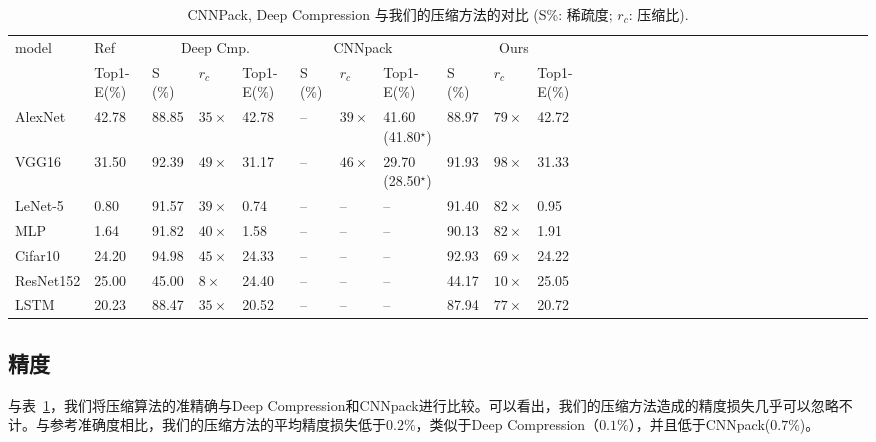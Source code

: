 \begin{table}[h]
\centering
\caption{\footnotesize CNNPack, Deep Compression 与我们的压缩方法的对比 (S\%: 稀疏度; $r_c$: 压缩比).}
\scriptsize
\label{tab:deepratio}
\centering
\begin{tabular}{l@{~~}@{~~}lll@{~~}lll@{~~}lllll@{~~}lll@{~~}lll@{~~}lllll@{~~}lll@{~~}lll@{~~}ll}
\toprule
model 	& Ref 				& \multicolumn{3}{c}{Deep Cmp.~\cite{han2015deep}} 	& \multicolumn{3}{c}{CNNpack~\cite{wang2016cnnpack}} 	& \multicolumn{3}{c}{Ours}				\\
  		& Top1-E(\%) 		& S (\%) & $r_c$ & Top1-E(\%) 	 					& S (\%) & $r_c$ & Top1-E(\%)  	 						&S (\%) & $r_c$ & Top1-E(\%) 		\\
\midrule
AlexNet  	& 42.78			& 88.85	& $35\times$ 	& 42.78 							& --	 &  $39\times$  & 41.60 (41.80$^{\star}$) 				 		& 88.97 & $79\times$	& 42.72				\\
VGG16		& 31.50			& 92.39	& $49\times$ 	& 31.17								& --	 &  $46\times$  & 29.70 (28.50$^{\star}$)							& 91.93  & $98\times$ 	& 31.33				\\
LeNet-5 	& 0.80			& 91.57	& $39\times$ 	& 0.74 								& --	 &  --   & --									& 91.40  & $82\times$ 	& 0.95			 	\\
MLP 		& 1.64			& 91.82	& $40\times$ 	& 1.58								& --  	 &  -- 	 & -- 									& 90.13  & $82\times$ 	& 1.91				\\
Cifar10 	& 24.20			& 94.98	& $45\times$ 	& 24.33								& --	 &  --   & -- 									& 92.93  & $69\times$   & 24.22				\\
ResNet152 	& 25.00			& 45.00 & $8\times$		& 24.40 							& --	 &  --	 & -- 									& 44.17 & $10\times$ 	& 25.05				\\
LSTM 		& 20.23			& 88.47 & $35\times$ 	& 20.52								& --	 &  --   & --									& 87.94	& $77\times$ 	& 20.72				\\
\bottomrule
\end{tabular}
\end{table}

\subsection{精度}
与表~\ref{tab:deepratio}，我们将压缩算法的准精确与Deep Compression和CNNpack进行比较。可以看出，我们的压缩方法造成的精度损失几乎可以忽略不计。与参考准确度相比，我们的压缩方法的平均精度损失低于$0.2\%$，类似于Deep Compression（$0.1\%$），并且低于CNNpack($0.7\%$)。

